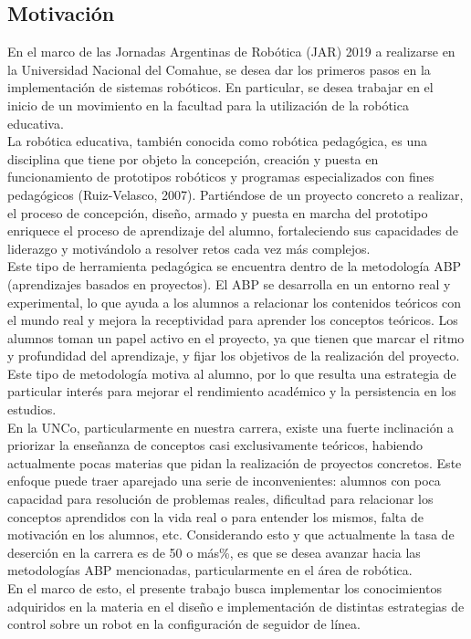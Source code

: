 \documentclass[10pt,conference,a4paper,onecolumn]{article}%
\begin{document}
\subsection{Motivación}
En el marco de las Jornadas Argentinas de Robótica (JAR) 2019 a realizarse en la Universidad Nacional del Comahue, se desea dar los primeros pasos en la implementación de sistemas robóticos. En particular, se desea trabajar en el inicio de un movimiento en la facultad para la utilización de la robótica educativa. \\
La robótica educativa, también conocida como robótica pedagógica, es una disciplina que tiene por objeto la concepción, creación y puesta en funcionamiento de prototipos robóticos y programas especializados con fines pedagógicos (Ruiz-Velasco, 2007). Partiéndose de un proyecto concreto a realizar, el proceso de concepción, diseño, armado y puesta en marcha del prototipo enriquece el proceso de aprendizaje del alumno, fortaleciendo sus capacidades de liderazgo y motivándolo a resolver retos cada vez más
complejos. \\
Este tipo de herramienta pedagógica se encuentra dentro de la metodología ABP (aprendizajes basados en proyectos). El ABP se desarrolla en un entorno real y experimental, lo que ayuda a los alumnos a relacionar los contenidos teóricos con el mundo real y mejora la receptividad para aprender los conceptos teóricos. Los alumnos toman un papel activo en el proyecto, ya que tienen que marcar el ritmo y profundidad del aprendizaje, y fijar los objetivos de la realización del proyecto. Este tipo de metodología motiva al alumno, por lo que resulta una estrategia de particular interés para mejorar el rendimiento académico y la persistencia
en los estudios. \\
En la UNCo, particularmente en nuestra carrera, existe una fuerte inclinación a priorizar la enseñanza de conceptos casi exclusivamente teóricos, habiendo actualmente pocas materias que pidan la realización de proyectos concretos. Este enfoque puede traer aparejado una serie de inconvenientes: alumnos con poca capacidad para resolución de problemas reales, dificultad para relacionar los conceptos aprendidos con la vida real o para entender los mismos, falta de motivación en los alumnos, etc. Considerando esto y que actualmente la tasa de deserción en la carrera es de 50 o más\%, es que se desea avanzar hacia las metodologías
ABP mencionadas, particularmente en el área de robótica. \\
En el marco de esto, el presente trabajo busca implementar los conocimientos adquiridos en la materia en el diseño e implementación de distintas estrategias de control sobre un robot en la configuración de seguidor de línea.
\end{document}
